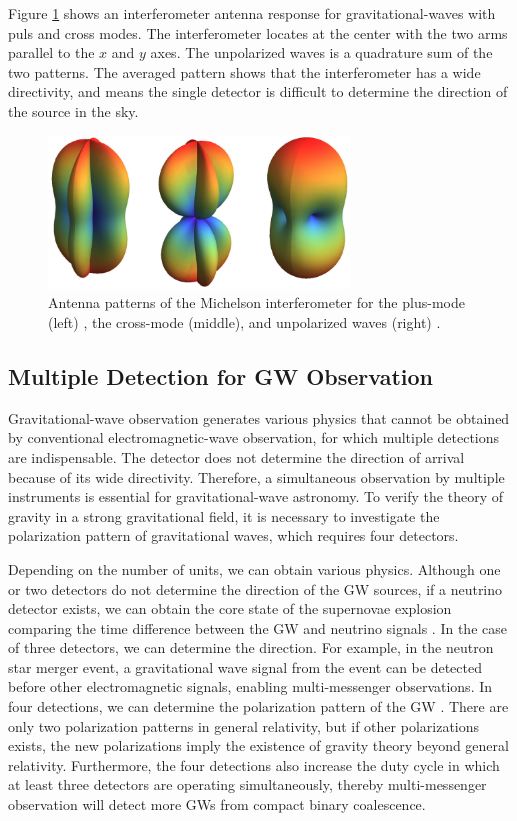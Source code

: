 Figure \ref{img:img130} shows an interferometer antenna response for gravitational-waves with puls and cross modes. The interferometer locates at the center with the two arms parallel to the $x$ and $y$ axes. The unpolarized waves is a quadrature sum of the two patterns. The averaged pattern shows that the interferometer has a wide directivity, and means the single detector is difficult to determine the direction of the source in the sky.
\begin{figure}[h]
  \begin{center}   
    \includegraphics[width=8.0cm]{./img_chap1/img130.png}
    \caption{Antenna patterns of the Michelson interferometer for the plus-mode (left) , the cross-mode (middle), and unpolarized waves (right) \cite{Adhikari2014}. }\label{img:img130}
  \end{center}
\end{figure}

\subsection{Multiple Detection for GW Observation}\label{sec:123}
Gravitational-wave observation generates various physics that cannot be obtained by conventional electromagnetic-wave observation, for which multiple detections are indispensable. The detector does not determine the direction of arrival because of its wide directivity. Therefore, a simultaneous observation by multiple instruments is essential for gravitational-wave astronomy. To verify the theory of gravity in a strong gravitational field, it is necessary to investigate the polarization pattern of gravitational waves, which requires four detectors.             

Depending on the number of units, we can obtain various physics. Although one or two detectors do not determine the direction of the GW sources, if a neutrino detector exists, we can obtain the core state of the supernovae explosion comparing the time difference between the GW and neutrino signals \cite{yokozawa2015probing}. In the case of three detectors, we can determine the direction. For example, in the neutron star merger event, a gravitational wave signal from the event can be detected before other electromagnetic signals, enabling multi-messenger observations. In four detections, we can determine the polarization pattern of the GW \cite{takeda2018polarization}. There are only two polarization patterns in general relativity, but if other polarizations exists, the new polarizations imply the existence of gravity theory beyond general relativity. Furthermore, the four detections also increase the duty cycle in which at least three detectors are operating simultaneously, thereby multi-messenger observation will detect more GWs from compact binary coalescence.


